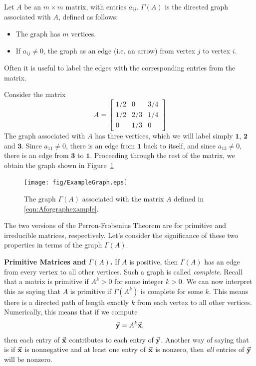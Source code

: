 \begin{definition}
Let $A$ be an $m \times m$ matrix, with entries
$a_{ij}$.
$\Gamma(A)$ is the directed graph associated with $A$, defined as follows:
\begin{itemize}
\item The graph has $m$ vertices.
\item If $a_{ij} \ne 0$, the graph as an edge
(i.e. an arrow) from vertex $j$ to vertex $i$.
\end{itemize}
\end{definition}
Often it is useful to label the edges with the corresponding entries from
the matrix.
\begin{xexample}
Consider the matrix
\begin{equation}
    A = \begin{bmatrix}
             1/2 & 0 & 3/4 \\
             1/2 & 2/3 & 1/4 \\
              0  & 1/3 & 0 
        \end{bmatrix}
\label{eqn:Aforgraphexample}
\end{equation}
The graph associated with $A$ has three vertices, which we will
label simply $\textbf{1}$, $\textbf{2}$ and $\textbf{3}$.
Since $a_{11} \ne 0$, there is an edge from $\textbf{1}$ back to
itself, and since $a_{13}\ne 0$, there is an edge from $\textbf{3}$
to $\textbf{1}$.  Proceeding through the rest of the matrix, we
obtain the graph shown in Figure~\ref{fig:graphexample}
\end{xexample}
\begin{figure}
\centerline{\texttt{[image: fig/ExampleGraph.eps]}}
\caption{The graph $\Gamma(A)$ associated with the matrix $A$ defined
in \eqref{eqn:Aforgraphexample}.}
\label{fig:graphexample}
\end{figure}

The two versions of the Perron-Frobenius Theorem
are for primitive and irreducible matrices, respectively.
Let's consider the significance of these two properties
in terms of the graph $\Gamma(A)$.

\medskip
\noindent
\textbf{Primitive Matrices and $\Gamma(A)$.}
If $A$ is positive, then $\Gamma(A)$ has an edge from every
vertex to all other vertices.
Such a graph is called \emph{complete}.
Recall that a matrix is primitive if $A^k > 0$ for some
integer $k>0$.  We can now interpret this as saying that
$A$ is primitive if $\Gamma(A^k)$ is complete for some $k$.
This means there is a directed path of length exactly
$k$ from each vertex to all other vertices.
Numerically, this means that if we compute
\begin{equation}
   \vec{\textbf{y}} = A^k \vec{\textbf{x}},
\end{equation}
then each entry of $\vec{\textbf{x}}$ contributes to each entry of $\vec{\textbf{y}}$.
Another way of saying that is if $\vec{\textbf{x}}$ is nonnegative and at least
one entry of $\vec{\textbf{x}}$ is nonzero, 
then \emph{all} entries of $\vec{\textbf{y}}$ will be nonzero.

